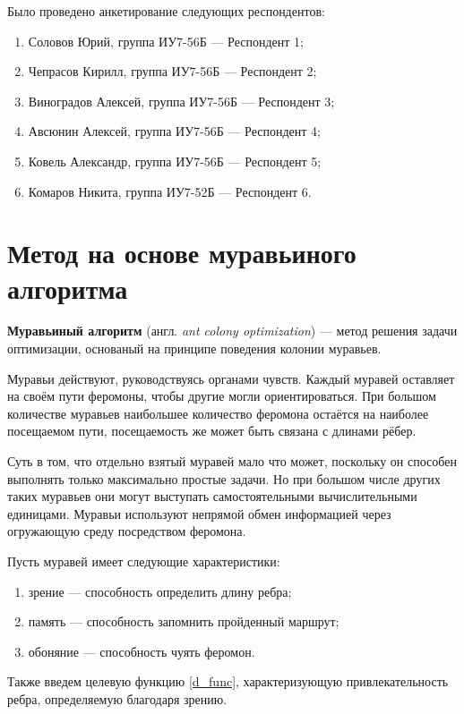 Было проведено анкетирование следующих респондентов:
\begin{enumerate}[label=\arabic*)]
	\item Соловов Юрий, группа ИУ7-56Б --- Респондент 1;
	\item Чепрасов Кирилл, группа ИУ7-56Б --- Респондент 2;
	\item Виноградов Алексей, группа ИУ7-56Б --- Респондент 3;
	\item Авсюнин Алексей, группа ИУ7-56Б --- Респондент 4;
	\item Ковель Александр, группа ИУ7-56Б --- Респондент 5;
	\item Комаров Никита, группа ИУ7-52Б --- Респондент 6.
\end{enumerate}


\section{Метод на основе муравьиного алгоритма}

\textbf{Муравьиный алгоритм} (англ. \textit{ant colony optimization})  \cite{full-comb} --- метод решения задачи оптимизации, основаный на принципе поведения колонии муравьев.

Муравьи действуют, руководствуясь органами чувств. 
Каждый муравей оставляет на своём пути феромоны, чтобы другие могли ориентироваться. 
При большом количестве муравьев наибольшее количество феромона остаётся на наиболее посещаемом пути, посещаемость же может быть связана с длинами рёбер.

Суть в том, что отдельно взятый муравей мало что может, поскольку он способен выполнять только максимально простые задачи. Но при большом числе других таких муравьев они могут выступать самостоятельными вычислительными единицами. Муравьи используют непрямой обмен информацией через огружающую среду посредством феромона.

Пусть муравей имеет следующие характеристики:
\begin{enumerate}[label=\arabic*)]
	\item зрение --- способность определить длину ребра;
	\item память --- способность запомнить пройденный маршрут;
	\item обоняние --- способность чуять феромон.
\end{enumerate}


Также введем целевую функцию \eqref{d_func}, характеризующую привлекательность ребра, определяемую благодаря зрению.

